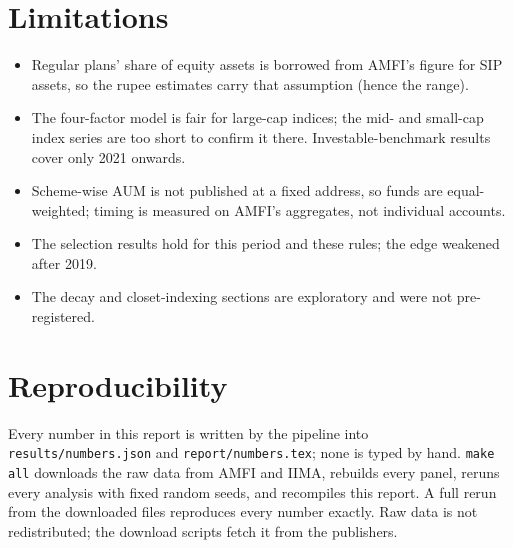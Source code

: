 \documentclass[11pt]{article}
\begin{document}
\section{Limitations}
\begin{itemize}[leftmargin=1.2em]
\item Regular plans' share of equity assets is borrowed from AMFI's figure for SIP assets, so the rupee estimates carry that assumption (hence the range).
\item The four-factor model is fair for large-cap indices; the mid- and small-cap index series are too short to confirm it there. Investable-benchmark results cover only 2021 onwards.
\item Scheme-wise AUM is not published at a fixed address, so funds are equal-weighted; timing is measured on AMFI's aggregates, not individual accounts.
\item The selection results hold for this period and these rules; the edge weakened after 2019.
\item The decay and closet-indexing sections are exploratory and were not pre-registered.
\end{itemize}

\section{Reproducibility}
Every number in this report is written by the pipeline into \nolinkurl{results/numbers.json} and \nolinkurl{report/numbers.tex}; none is typed by hand. \texttt{make all} downloads the raw data from AMFI and IIMA, rebuilds every panel, reruns every analysis with fixed random seeds, and recompiles this report. A full rerun from the downloaded files reproduces every number exactly. Raw data is not redistributed; the download scripts fetch it from the publishers.
\end{document}
